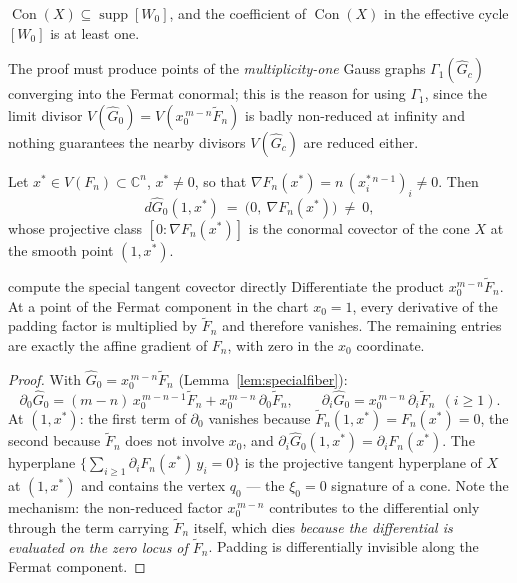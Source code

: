 \documentclass[acmsmall,screen,nonacm]{acmart}
\theoremstyle{definition}
\theoremstyle{remark}
\DeclareMathOperator{\Con}{Con}
\DeclareMathOperator{\supp}{supp}
\newcommand{\CC}{\mathbb{C}}
\newcommand{\Gone}{\Gamma_{\!1}}
\begin{document}
\begin{proposition}[Containment]\label{prop:containment}
$\Con(X)\subseteq\supp[W_0]$, and the coefficient of $\Con(X)$ in the
effective cycle $[W_0]$ is at least one.
\end{proposition}

The proof must produce points of the \emph{multiplicity-one} Gauss
graphs $\Gone(\widehat G_c)$ converging into the Fermat conormal; this
is the reason for using $\Gone$, since the limit divisor
$V(\widehat G_0)=V(x_0^{\,m-n}\widetilde F_n)$ is badly non-reduced at
infinity and nothing guarantees the nearby divisors
$V(\widehat G_c)$ are reduced either.

\begin{lemma}
\label{lem:covector}
Let $x^*\in V(F_n)\subset\CC^n$, $x^*\ne0$, so that
$\nabla F_n(x^*)=n\,(x_i^{*\,n-1})_i\ne0$.  Then
\[
  d\widehat G_0(1,x^*)\ =\ \big(0,\ \nabla F_n(x^*)\big)\ \ne\ 0,
\]
whose projective class $[0:\nabla F_n(x^*)]$ is the conormal covector
of the cone $X$ at the smooth point $(1,x^*)$.
\end{lemma}

\begin{roadmapbox}{compute the special tangent covector directly}
Differentiate the product $x_0^{m-n}\widetilde F_n$.  At a point of the
Fermat component in the chart $x_0=1$, every derivative of the padding factor
is multiplied by $\widetilde F_n$ and therefore vanishes.  The remaining
entries are exactly the affine gradient of $F_n$, with zero in the $x_0$
coordinate.
\end{roadmapbox}

\begin{proof}
With $\widehat G_0=x_0^{\,m-n}\widetilde F_n$
(Lemma~\ref{lem:specialfiber}):
\[
  \partial_0\widehat G_0=(m-n)\,x_0^{\,m-n-1}\widetilde F_n
  +x_0^{\,m-n}\,\partial_0\widetilde F_n,
  \qquad
  \partial_i\widehat G_0=x_0^{\,m-n}\,\partial_i\widetilde F_n\ \
  (i\ge1).
\]
At $(1,x^*)$: the first term of $\partial_0$ vanishes because
$\widetilde F_n(1,x^*)=F_n(x^*)=0$, the second because
$\widetilde F_n$ does not involve $x_0$, and
$\partial_i\widehat G_0(1,x^*)=\partial_iF_n(x^*)$.  The hyperplane
$\{\sum_{i\ge1}\partial_iF_n(x^*)\,y_i=0\}$ is the projective tangent
hyperplane of $X$ at $(1,x^*)$ and contains the vertex $q_0$ --- the
$\xi_0=0$ signature of a cone.  Note the mechanism: the non-reduced
factor $x_0^{\,m-n}$ contributes to the differential only through the
term carrying $\widetilde F_n$ itself, which dies \emph{because the
differential is evaluated on the zero locus of $\widetilde F_n$}.
Padding is differentially invisible along the Fermat component.
\end{proof}
\end{document}
